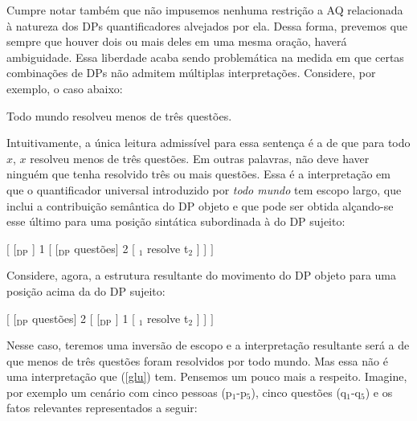 Cumpre notar também que não impusemos nenhuma restrição a AQ relacionada à natureza dos DPs quantificadores alvejados por ela. Dessa forma, prevemos que sempre que houver dois ou mais deles em uma mesma oração, haverá ambiguidade. Essa liberdade acaba sendo problemática na medida em que certas combinações de DPs não admitem múltiplas interpretações. Considere, por exemplo, o caso abaixo:

\begin{exe}

	\ex Todo mundo resolveu menos de três questões. \label{glu}	
	
\end{exe}

\n Intuitivamente, a única leitura admissível para essa sentença é a de que para todo $x$, $x$ resolveu menos de três questões. Em outras palavras, não deve haver ninguém que tenha resolvido três ou mais questões. Essa é a interpretação em que o quantificador universal introduzido por \textit{todo mundo} tem escopo largo, que inclui a contribuição semântica do DP objeto e que pode ser obtida alçando-se esse último para uma posição sintática subordinada à do DP sujeito:

\medskip

\begin{exe}
	\ex $[$ [$_{\text{DP}}$ ] 1 [ [$_{\text{DP}}$  questões] 2 [ $_{1}$ resolve t$_{2}$ ]  ] $]$
\end{exe}	

\medskip

Considere, agora, a estrutura resultante do movimento do DP objeto para uma posição acima da do DP sujeito:

\begin{exe}
	\ex $[$ [$_{\text{DP}}$  questões] 2 [ [$_{\text{DP}}$ ] 1 [ $_{1}$ resolve t$_{2}$ ]  ] $]$
\end{exe}

\medskip

\n Nesse caso, teremos uma inversão de escopo e a interpretação resultante será a de que menos de três questões foram resolvidos por todo mundo. Mas essa não é uma interpretação que (\ref{glu}) tem. Pensemos um pouco mais a respeito. Imagine, por exemplo um cenário com cinco pessoas (p$_{1}$-p$_{5}$), cinco questões (q$_{1}$-q$_{5}$) e os fatos relevantes representados a seguir:

